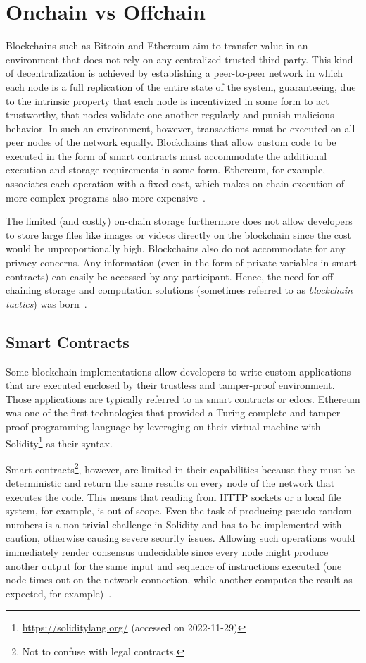 \section{Onchain vs Offchain}
Blockchains such as Bitcoin and Ethereum aim to transfer value in an environment that does not rely on any centralized trusted third party. This kind of decentralization is achieved by establishing a peer-to-peer network in which each node is a full replication of the entire state of the system, guaranteeing, due to the intrinsic property that each node is incentivized in some form to act trustworthy, that nodes validate one another regularly and punish malicious behavior. In such an environment, however, transactions must be executed on all peer nodes of the network equally. Blockchains that allow custom code to be executed in the form of smart contracts must accommodate the additional execution and storage requirements in some form. Ethereum, for example, associates each operation with a fixed cost, which makes on-chain execution of more complex programs also more expensive~\cite{buterin2020}.

The limited (and costly) on-chain storage furthermore does not allow developers to store large files like images or videos directly on the blockchain since the cost would be unproportionally high. Blockchains also do not accommodate for any privacy concerns. Any information (even in the form of private variables in smart contracts) can easily be accessed by any participant. Hence, the need for off-chaining storage and computation solutions (sometimes referred to as \textit{blockchain tactics}) was born~\cite{towards_blockchain_tactics,eberhardt17off_block}.


\subsection{Smart Contracts}
Some blockchain implementations allow developers to write custom applications that are executed enclosed by their trustless and tamper-proof environment. Those applications are typically referred to as smart contracts or \glspl{edcc}. Ethereum was one of the first technologies that provided a Turing-complete and tamper-proof programming language by leveraging on their virtual machine with Solidity\footnote{\url{https://soliditylang.org/} (accessed on 2022-11-29)} as their syntax.

Smart contracts\footnote{Not to confuse with legal contracts.}, however, are limited in their capabilities because they must be deterministic and return the same results on every node of the network that executes the code. This means that reading from HTTP sockets or a local file system, for example, is out of scope. Even the task of producing pseudo-random numbers is a non-trivial challenge in Solidity and has to be implemented with caution, otherwise causing severe security issues. Allowing such operations would immediately render consensus undecidable since every node might produce another output for the same input and sequence of instructions executed (one node times out on the network connection, while another computes the result as expected, for example)~\cite{buterin2020}.


